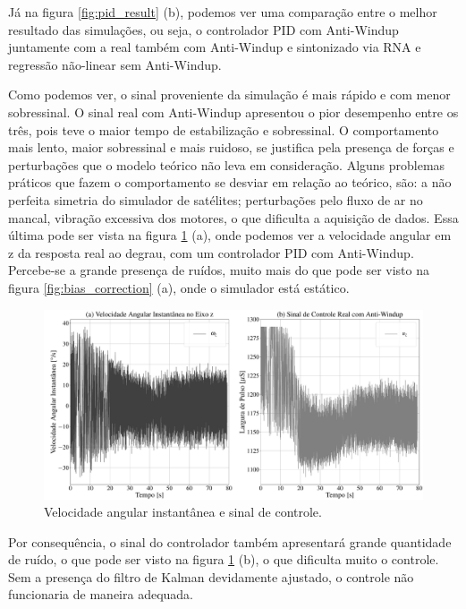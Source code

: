 Já na figura \ref{fig:pid_result} (b), podemos ver uma comparação entre o melhor resultado das simulações, ou seja, o controlador PID com Anti-Windup juntamente com a real também com Anti-Windup e sintonizado via RNA e regressão não-linear sem Anti-Windup.

Como podemos ver, o sinal proveniente da simulação é mais rápido e com menor sobressinal. O sinal real com Anti-Windup apresentou o pior desempenho entre os três, pois teve o maior tempo de estabilização e sobressinal. O comportamento mais lento, maior sobressinal e mais ruidoso, se justifica pela presença de forças e perturbações que o modelo teórico não leva em consideração. Alguns problemas práticos que fazem o comportamento se desviar em relação ao teórico, são: a não perfeita simetria do simulador de satélites; perturbações pelo fluxo de ar no mancal, vibração excessiva dos motores, o que dificulta a aquisição de dados. Essa última pode ser vista na figura \ref{fig:pid_result_controlller} (a), onde podemos ver a velocidade angular em z da resposta real ao degrau, com um controlador PID com Anti-Windup. Percebe-se a grande presença de ruídos, muito mais do que pode ser visto na figura \ref{fig:bias_correction} (a), onde o simulador está estático.

\begin{figure}[H]
  \caption{Velocidade angular instantânea e sinal de controle.}
  \begin{center}
      \includegraphics[scale=0.26]{resultados/img/pid_result_controller}
  \end{center}
  \label{fig:pid_result_controlller}
\end{figure}

Por consequência, o sinal do controlador também apresentará grande quantidade de ruído, o que pode ser visto na figura \ref{fig:pid_result_controlller} (b), o que dificulta muito o controle. Sem a presença do filtro de Kalman devidamente ajustado, o controle não funcionaria de maneira adequada.

